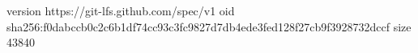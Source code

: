 version https://git-lfs.github.com/spec/v1
oid sha256:f0dabccb0c2c6b1df74cc93c3fc9827d7db4ede3fed128f27cb9f3928732dccf
size 43840
